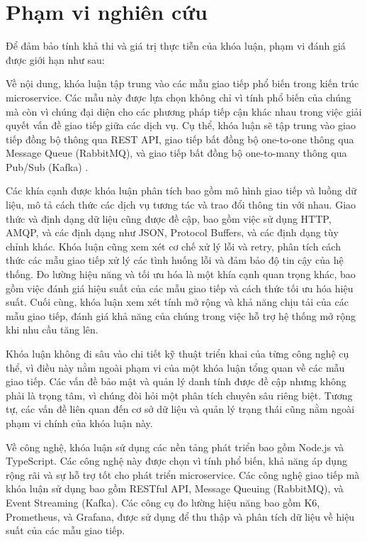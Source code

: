 \section{Phạm vi nghiên cứu}
Để đảm bảo tính khả thi và giá trị thực tiễn của khóa luận, phạm vi đánh giá được giới hạn như sau:

Về nội dung, khóa luận tập trung vào các mẫu giao tiếp phổ biến trong kiến trúc microservice. Các mẫu này được lựa chọn không chỉ vì tính phổ biến của chúng mà còn vì chúng đại diện cho các phương pháp tiếp cận khác nhau trong việc giải quyết vấn đề giao tiếp giữa các dịch vụ. Cụ thể, khóa luận sẽ tập trung vào giao tiếp đồng bộ thông qua REST API, giao tiếp bất đồng bộ one-to-one thông qua Message Queue (RabbitMQ), và giao tiếp bất đồng bộ one-to-many thông qua Pub/Sub (Kafka) \cite{aksakalli2021}.

Các khía cạnh được khóa luận phân tích bao gồm mô hình giao tiếp và luồng dữ liệu, mô tả cách thức các dịch vụ tương tác và trao đổi thông tin với nhau. Giao thức và định dạng dữ liệu cũng được đề cập, bao gồm việc sử dụng HTTP, AMQP, và các định dạng như JSON, Protocol Buffers, và các định dạng tùy chỉnh khác. Khóa luận cũng xem xét cơ chế xử lý lỗi và retry, phân tích cách thức các mẫu giao tiếp xử lý các tình huống lỗi và đảm bảo độ tin cậy của hệ thống. Đo lường hiệu năng và tối ưu hóa là một khía cạnh quan trọng khác, bao gồm việc đánh giá hiệu suất của các mẫu giao tiếp và cách thức tối ưu hóa hiệu suất. Cuối cùng, khóa luận xem xét tính mở rộng và khả năng chịu tải của các mẫu giao tiếp, đánh giá khả năng của chúng trong việc hỗ trợ hệ thống mở rộng khi nhu cầu tăng lên.

Khóa luận không đi sâu vào chi tiết kỹ thuật triển khai của từng công nghệ cụ thể, vì điều này nằm ngoài phạm vi của một khóa luận tổng quan về các mẫu giao tiếp. Các vấn đề bảo mật và quản lý danh tính được đề cập nhưng không phải là trọng tâm, vì chúng đòi hỏi một phân tích chuyên sâu riêng biệt. Tương tự, các vấn đề liên quan đến cơ sở dữ liệu và quản lý trạng thái cũng nằm ngoài phạm vi chính của khóa luận này.

Về công nghệ, khóa luận sử dụng các nền tảng phát triển bao gồm Node.js và TypeScript. Các công nghệ này được chọn vì tính phổ biến, khả năng áp dụng rộng rãi và sự hỗ trợ tốt cho phát triển microservice. Các công nghệ giao tiếp mà khóa luận sử dụng bao gồm RESTful API, Message Queuing (RabbitMQ), và Event Streaming (Kafka). Các công cụ đo lường hiệu năng bao gồm K6, Prometheus, và Grafana, được sử dụng để thu thập và phân tích dữ liệu về hiệu suất của các mẫu giao tiếp.

